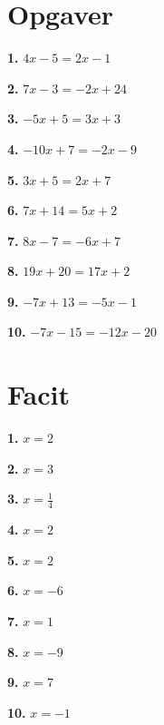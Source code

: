 \section*{Opgaver}

\textbf{1.} $4x - 5 = 2x - 1$

\textbf{2.} $7x - 3 = -2x + 24$

\textbf{3.} $-5x + 5 = 3x + 3$

\textbf{4.} $-10x + 7 = -2x - 9$

\textbf{5.} $3x + 5 = 2x + 7$

\textbf{6.} $7x + 14 = 5x + 2$

\textbf{7.} $8x -7 = -6x + 7$

\textbf{8.} $19x + 20 = 17x + 2$

\textbf{9.} $-7x +13 = -5x - 1$

\textbf{10.} $-7x - 15 = -12x - 20$



\newpage

\section*{Facit}

\textbf{1.} $x = 2$

\textbf{2.} $x = 3$

\textbf{3.} $x = \frac{1}{4}$

\textbf{4.} $x = 2$

\textbf{5.} $x = 2$

\textbf{6.} $x = -6$

\textbf{7.} $x = 1$

\textbf{8.} $x = -9$

\textbf{9.} $x = 7$

\textbf{10.} $x = -1$


